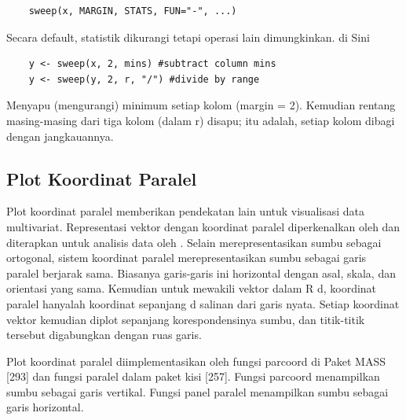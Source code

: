 \documentclass[a4paper,12pt]{article}
\theoremstyle{definition}
\begin{document}
\begin{lstlisting}
    sweep(x, MARGIN, STATS, FUN="-", ...)
\end{lstlisting}

Secara default, statistik dikurangi tetapi operasi lain dimungkinkan. di Sini 

\begin{lstlisting}
    y <- sweep(x, 2, mins) #subtract column mins
    y <- sweep(y, 2, r, "/") #divide by range
\end{lstlisting}

Menyapu (mengurangi) minimum setiap kolom (margin = 2). Kemudian rentang masing-masing dari tiga kolom (dalam r) disapu; itu adalah, setiap kolom dibagi dengan jangkauannya.


\subsection{Plot Koordinat Paralel}

Plot koordinat paralel memberikan pendekatan lain untuk visualisasi data multivariat. Representasi vektor dengan koordinat paralel diperkenalkan oleh \cite{Inselberg1985} dan diterapkan untuk analisis data oleh \cite{Wegman1990}. Selain merepresentasikan sumbu sebagai ortogonal, sistem koordinat paralel merepresentasikan sumbu sebagai garis paralel berjarak sama. Biasanya garis-garis ini horizontal dengan asal, skala, dan orientasi yang sama. Kemudian untuk mewakili vektor dalam R d, koordinat paralel hanyalah koordinat sepanjang d salinan dari garis nyata. Setiap koordinat vektor kemudian diplot sepanjang korespondensinya sumbu, dan titik-titik tersebut digabungkan dengan ruas garis.

Plot koordinat paralel diimplementasikan oleh fungsi parcoord di Paket MASS [293] dan fungsi paralel dalam paket kisi [257]. Fungsi parcoord menampilkan sumbu sebagai garis vertikal. Fungsi panel paralel menampilkan sumbu sebagai garis horizontal.
\end{document}
